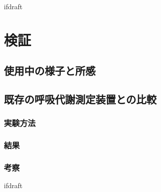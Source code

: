 \expandafter\ifx\csname ifdraft\endcsname\relax
 
\fi

\section{検証}

\subsection{使用中の様子と所感}

\subsection{既存の呼吸代謝測定装置との比較}

\subsubsection{実験方法}

\subsubsection{結果}

\subsubsection{考察}

\expandafter\ifx\csname ifdraft\endcsname\relax
  
\fi
